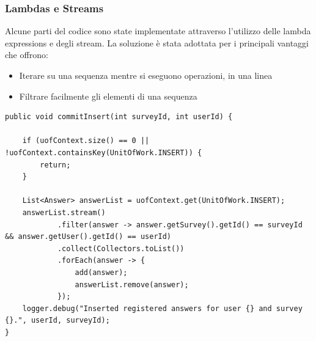 \documentclass[12pt]{article}
\begin{document}
\subsubsection{Lambdas e Streams}
Alcune parti del codice sono state implementate attraverso l'utilizzo delle lambda expressions e degli stream. La soluzione è stata adottata per i principali vantaggi che offrono: 
\begin{itemize}
    \item Iterare su una sequenza mentre si eseguono operazioni, in una linea
    \item Filtrare facilmente gli elementi di una sequenza
\end{itemize}
 \begin{lstlisting}
public void commitInsert(int surveyId, int userId) {

	if (uofContext.size() == 0 || !uofContext.containsKey(UnitOfWork.INSERT)) {
		return;
	}

	List<Answer> answerList = uofContext.get(UnitOfWork.INSERT);
	answerList.stream()
			.filter(answer -> answer.getSurvey().getId() == surveyId && answer.getUser().getId() == userId)
			.collect(Collectors.toList())
			.forEach(answer -> {
				add(answer);
				answerList.remove(answer);
			});
	logger.debug("Inserted registered answers for user {} and survey {}.", userId, surveyId);
}
\end{lstlisting}

\end{document}
